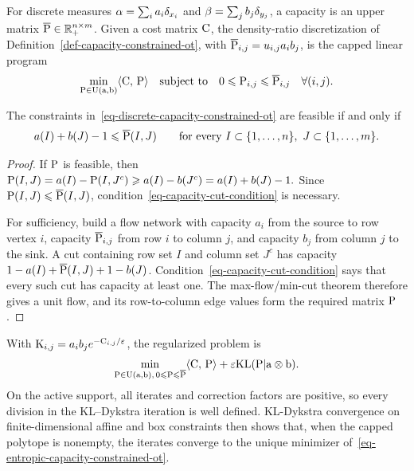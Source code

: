 For discrete measures $\alpha=\sum_i a_i\de_{x_i}$ and $\beta=\sum_j b_j\de_{y_j}$, a capacity is an upper matrix $\overline{\P}\in\RR_+^{n\times m}$. Given a cost matrix $\C$, the density-ratio discretization of Definition~\ref{def-capacity-constrained-ot}, with $\overline{\P}_{i,j}=u_{i,j}a_i b_j$, is the capped linear program
\begin{equation}\label{eq-discrete-capacity-constrained-ot}
\min_{\P\in\CouplingsD(\a,\b)}
\dotp{\C}{\P}
\quad\text{subject to}\quad
0\leq \P_{i,j}\leq \overline{\P}_{i,j}\quad\forall(i,j).
\end{equation}
\begin{prop}\label{prop-capacity-feasibility}
The constraints in~\eqref{eq-discrete-capacity-constrained-ot} are feasible if and only if
\begin{equation}\label{eq-capacity-cut-condition}
a(I)+b(J)-1\leq \overline{\P}(I,J)
\qquad
\text{for every }I\subset\{1,\ldots,n\},\ J\subset\{1,\ldots,m\}.
\end{equation}
\end{prop}
\begin{proof}
If $\P$ is feasible, then
\(\P(I,J) = a(I)-\P(I,J^c) \geq a(I)-b(J^c) = a(I)+b(J)-1.\)
Since $\P(I,J)\leq \overline{\P}(I,J)$, condition~\eqref{eq-capacity-cut-condition} is necessary.

For sufficiency, build a flow network with capacity $a_i$ from the source to row vertex $i$, capacity $\overline{\P}_{i,j}$ from row $i$ to column $j$, and capacity $b_j$ from column $j$ to the sink. A cut containing row set $I$ and column set $J^c$ has capacity
\(1-a(I)+\overline{\P}(I,J)+1-b(J)\).
Condition~\eqref{eq-capacity-cut-condition} says that every such cut has capacity at least one. The max-flow/min-cut theorem therefore gives a unit flow, and its row-to-column edge values form the required matrix $\P$.
\end{proof}
With $\K_{i,j}=a_i b_j e^{-\C_{i,j}/\epsilon}$, the regularized problem is
\begin{equation}\label{eq-entropic-capacity-constrained-ot}
\min_{\P\in\CouplingsD(\a,\b),\,0\leq \P\leq \overline{\P}}
\dotp{\C}{\P}
+
\epsilon\KLD(\P|\a\otimes\b).
\end{equation}
On the active support, all iterates and correction factors are positive, so every division in the KL--Dykstra iteration is well defined. KL-Dykstra convergence on finite-dimensional affine and box constraints then shows that, when the capped polytope is nonempty, the iterates converge to the unique minimizer of~\eqref{eq-entropic-capacity-constrained-ot}.

